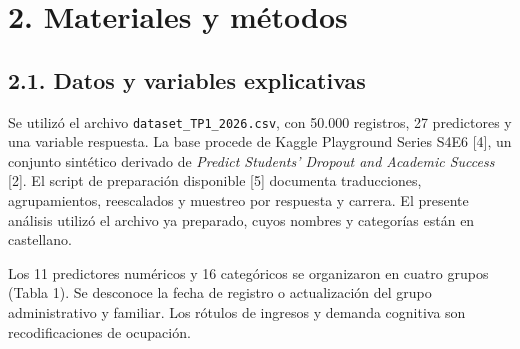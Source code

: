 \documentclass[10pt,a4paper]{article}
\begin{document}
\hypertarget{materiales-y-muxe9todos}{%
\section{2. Materiales y métodos}\label{materiales-y-muxe9todos}}

\hypertarget{datos-y-variables-explicativas}{%
\subsection{2.1. Datos y variables explicativas}\label{datos-y-variables-explicativas}}

Se utilizó el archivo \texttt{dataset\_TP1\_2026.csv}, con 50.000 registros, 27 predictores y una variable respuesta. La base procede de Kaggle
Playground Series S4E6 {[}4{]}, un conjunto sintético derivado de \emph{Predict Students' Dropout and Academic Success} {[}2{]}. El script de
preparación disponible {[}5{]} documenta traducciones, agrupamientos, reescalados y muestreo por respuesta y carrera. El presente análisis utilizó el
archivo ya preparado, cuyos nombres y categorías están en castellano.

Los 11 predictores numéricos y 16 categóricos se organizaron en cuatro grupos (Tabla 1). Se desconoce la fecha de registro o actualización del grupo
administrativo y familiar. Los rótulos de ingresos y demanda cognitiva son recodificaciones de ocupación.
\end{document}
